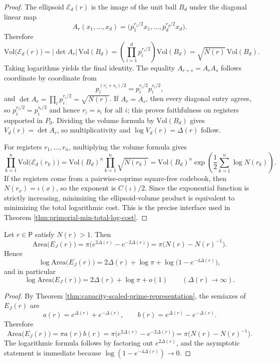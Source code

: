 \begin{proof}
The ellipsoid \(\mathcal E_d(r)\) is the image of the unit ball \(B_d\) under the diagonal linear map
\[
A_r(x_1,\dots,x_d)=\bigl(p_1^{r_1/2}x_1,\dots,p_d^{r_d/2}x_d\bigr).
\]
Therefore
\[
\mathrm{Vol}\bigl(\mathcal E_d(r)\bigr)=|\det A_r|\,\mathrm{Vol}(B_d)
=\left(\prod_{i=1}^{d}p_i^{r_i/2}\right)\mathrm{Vol}(B_d)
=\sqrt{N(r)}\,\mathrm{Vol}(B_d).
\]
Taking logarithms yields the final identity.
The equality \(A_{r+s}=A_rA_s\) follows coordinate by coordinate from
\[
p_i^{(r_i+s_i)/2}=p_i^{r_i/2}p_i^{s_i/2},
\]
and \(\det A_r=\prod_i p_i^{r_i/2}=\sqrt{N(r)}\). If \(A_r=A_s\), then every diagonal entry agrees, so \(p_i^{r_i/2}=p_i^{s_i/2}\) and hence \(r_i=s_i\) for all \(i\); this proves faithfulness on registers supported in \(P_0\). Dividing the volume formula by \(\mathrm{Vol}(B_d)\) gives \(V_d(r)=\det A_r\), so multiplicativity and \(\log V_d(r)=\Delta(r)\) follow.

For registers \(r_1,\dots,r_n\), multiplying the volume formula gives
\[
\prod_{k=1}^{n}\mathrm{Vol}\bigl(\mathcal E_d(r_k)\bigr)
=\mathrm{Vol}(B_d)^n\prod_{k=1}^{n}\sqrt{N(r_k)}
=\mathrm{Vol}(B_d)^n\exp\!\left(\frac12\sum_{k=1}^{n}\log N(r_k)\right).
\]
If the registers come from a pairwise-coprime square-free codebook, then \(N(r_x)=\iota(x)\), so the exponent is \(C(\iota)/2\). Since the exponential function is strictly increasing, minimizing the ellipsoid-volume product is equivalent to minimizing the total logarithmic cost. This is the precise interface used in Theorem \ref{thm:primorial-min-total-log-cost}.
\end{proof}

\begin{corollary}\label{cor:ellipse-area-ellipsoid-gap}
Let \(r\in\mathsf P\) satisfy \(N(r)>1\). Then
\[
\mathrm{Area}\bigl(E_J(r)\bigr)
=\pi\bigl(e^{2\Delta(r)}-e^{-2\Delta(r)}\bigr)
=\pi\bigl(N(r)-N(r)^{-1}\bigr).
\]
Hence
\[
\log\mathrm{Area}\bigl(E_J(r)\bigr)
=2\Delta(r)+\log\pi+\log\bigl(1-e^{-4\Delta(r)}\bigr),
\]
and in particular
\[
\log\mathrm{Area}\bigl(E_J(r)\bigr)=2\Delta(r)+\log\pi+o(1)
\qquad (\Delta(r)\to\infty).
\]
\end{corollary}

\begin{proof}
By Theorem \ref{thm:capacity-scaled-prime-representation}, the semiaxes of \(E_J(r)\) are
\[
a(r)=e^{\Delta(r)}+e^{-\Delta(r)},
\qquad
b(r)=e^{\Delta(r)}-e^{-\Delta(r)}.
\]
Therefore
\[
\mathrm{Area}\bigl(E_J(r)\bigr)
=\pi a(r)b(r)
=\pi\bigl(e^{2\Delta(r)}-e^{-2\Delta(r)}\bigr)
=\pi\bigl(N(r)-N(r)^{-1}\bigr).
\]
The logarithmic formula follows by factoring out \(e^{2\Delta(r)}\), and the asymptotic statement is immediate because \(\log(1-e^{-4\Delta(r)})\to 0\).
\end{proof}


